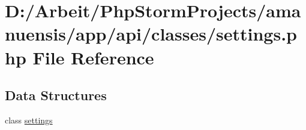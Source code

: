\hypertarget{settings_8php}{}\section{D\+:/\+Arbeit/\+Php\+Storm\+Projects/amanuensis/app/api/classes/settings.php File Reference}
\label{settings_8php}
\subsection*{Data Structures}
\begin{DoxyCompactItemize}
\item 
class \hyperlink{classsettings}{settings}
\end{DoxyCompactItemize}
